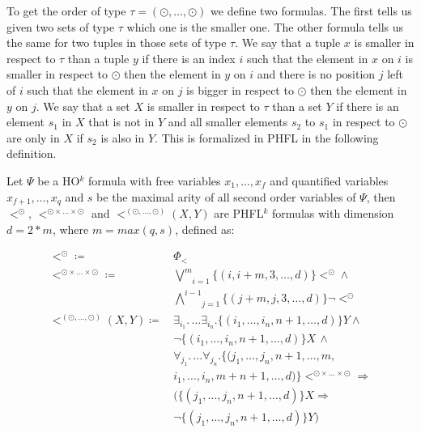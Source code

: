 To get the order of type $\tau = (\odot, \dots, \odot)$ we define two formulas. The first tells us given two
sets of type $\tau$ which one is the smaller one. The other formula tells us the same for two tuples in those sets
of type $\tau$. We say that a tuple $x$ is smaller in respect to $\tau$ than a tuple $y$ if there is an index $i$ such
that the element in $x$ on $i$ is smaller in respect to $\odot$ then the element in $y$ on $i$ and there is no position
$j$ left of $i$ such that the element in $x$ on $j$ is bigger in respect to $\odot$ then the element in $y$ on $j$. We
say that a set $X$ is smaller in respect to $\tau$ than a set $Y$ if there is an element $s_1$ in $X$ that is not in $Y$
and all smaller elements $s_2$ to $s_1$ in respect to $\odot$ are only in $X$ if $s_2$ is also in $Y$. This is
formalized in PHFL in the following definition.

\begin{definition}
    \label{definition:lower_bound_less_second}
    Let $\Psi$ be a HO$^k$ formula with free variables $x_1, \dots, x_f$ and quantified variables $x_{f+1}, \dots,
    x_q$ and $s$ be the maximal arity of all second order variables of $\Psi$, then $<^\odot$, $<^{\odot \times \dots
    \times \odot}$ and $<^{(\odot, \dots, \odot)}(X, Y)$ are PHFL$^k$ formulas with dimension $d = 2 * m$, where $m =
    max({q, s})$, defined as:

    \begin{align*}
        <^\odot \coloneqq &\,\Phi_< \\
        <^{\odot \times \dots \times \odot} \coloneqq
            &\,\underset{i = 1}{\overset{m}{\bigvee}}\{(i, i + m, 3, \dots, d)\} <^\odot \wedge \\
            &\,\underset{j = 1}{\overset{i - 1}{\bigwedge}}\{(j + m, j, 3, \dots, d)\} \neg <^\odot \\
        <^{(\odot, \dots, \odot)}(X, Y) \coloneqq
            &\,\exists_{i_1}.\, \dots \exists_{i_n}. \{(i_1, \dots, i_n, n + 1,\dots, d)\}Y \wedge \\
            &\,\neg \{(i_1, \dots, i_n, n + 1, \dots, d)\} X\,\wedge \\
            &\, \forall_{j_1}. \,\dots \forall_{j_n}. \{(j_1, \dots, j_n, n+1, \dots, m, \\
            &\,i_1, \dots, i_n, m + n + 1, \dots, d)\}<^{\odot \times \dots \times \odot} \Rightarrow \\
            &\,(\{(j_1,\dots, j_n, n + 1, \dots, d)\} X \Rightarrow \\
            &\,\neg \{(j_1, \dots, j_n, n + 1, \dots, d)\} Y)
    \end{align*}
\end{definition}

